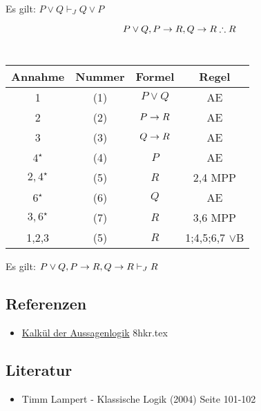 \documentclass{sajzk}
\begin{document}
Es gilt: $P \lor Q \vdash_J Q \lor P$
\begin{center}
    \[P \lor Q, P \rightarrow R, Q \rightarrow R \therefore R\] \\
\begin{tabular}{|c|c|c|c|}
  \hline
  Annahme            & Nummer & Formel       & Regel \\
  \hline
  1                  & (1)    & $P \lor Q$   & AE \\
  \hline
  2                  & (2)    & $P \rightarrow R$    & AE \\
  \hline
  3                  & (3)    & $Q \rightarrow R$    & AE \\
  \hline
  $4^\star$          & (4)    & $P$          & AE \\
  \hline
  $2, 4^\star$       & (5)    & $R$          & 2,4 MPP \\
  \hline
  $6^\star$          & (6)    & $Q$          & AE \\
  \hline
  $3, 6^\star$       & (7)    & $R$          & 3,6 MPP \\
  \hline
  1,2,3              & (5)    & $R$          & 1;4,5;6,7 $\lor$B \\
  \hline
\end{tabular}
\end{center}
Es gilt: $P \lor Q, P \rightarrow R, Q \rightarrow R \vdash_J R$
\subsection{Referenzen}
\begin{itemize}
    \item \href{8hkr.pdf}{Kalkül der Aussagenlogik} 8hkr.tex
\end{itemize}

\subsection{Literatur}
\begin{itemize}
    \item Timm Lampert - Klassische Logik (2004) Seite 101-102
\end{itemize}
\end{document}

